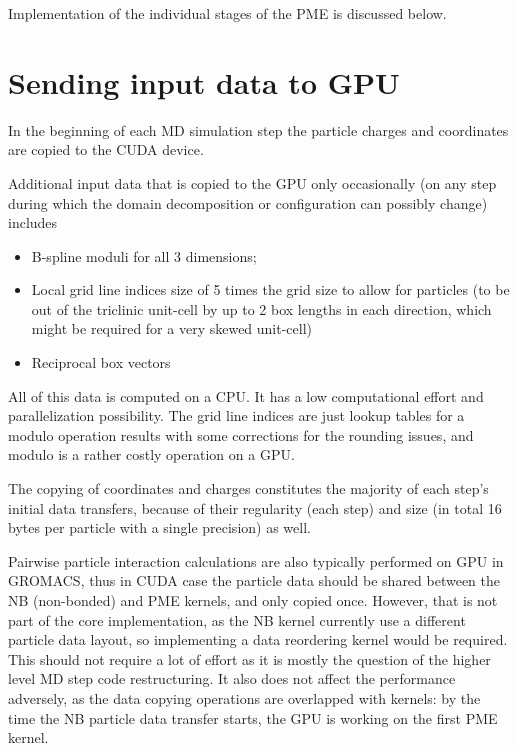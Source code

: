 \documentclass[12pt,a4paper]{report}
\newcommand{\draft}[1]{#1}
\begin{document}




Implementation of the individual stages of the PME is discussed below.

\section{Sending input data to GPU}
In the beginning of each MD simulation step the particle charges and coordinates are copied to the CUDA device.

Additional input data that is copied to the GPU only occasionally (on any step during which the domain decomposition or configuration can possibly change) includes
\begin{itemize}
\item B-spline moduli for all 3 dimensions;
\item Local grid line indices size of 5 times the grid size to allow for particles (to be out of the triclinic unit-cell by up to 2 box lengths in each direction, which might be required for a very skewed unit-cell)
\item Reciprocal box vectors
\end{itemize}
All of this data is computed on a CPU. It has a low computational effort and parallelization possibility. The grid line indices are just lookup tables for a modulo operation results with some corrections for the rounding issues, and modulo is a rather costly operation on a GPU.

The copying of coordinates and charges constitutes the majority of each step's initial data transfers, because of their regularity (each step) and size (in total 16 bytes per particle with a single precision) as well.

Pairwise particle interaction calculations are also typically performed on GPU in GROMACS, thus in CUDA case the particle data should be shared between the NB (non-bonded) and PME kernels, and only copied once. However, that is not part of the core implementation, as the NB kernel currently use a different particle data layout, so implementing a data reordering kernel would be required. This should not require a lot of effort as it is mostly the question of the higher level MD step code restructuring. It also does not affect the performance adversely, as the data copying operations are overlapped with kernels: by the time the NB particle data transfer starts, the GPU is working on the first PME kernel.
\end{document}
